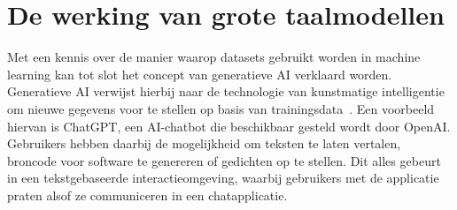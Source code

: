 \section{De werking van grote taalmodellen}
\label{sec:ls-artificiele-intelligentie}
Met een kennis over de manier waarop datasets gebruikt worden in machine learning kan tot slot het concept van generatieve AI verklaard worden.
Generatieve AI verwijst hierbij naar de technologie van kunstmatige intelligentie om nieuwe gegevens voor te stellen op basis van trainingsdata~\autocite{Gupta2023}.
Een voorbeeld hiervan is ChatGPT, een AI-chatbot die beschikbaar gesteld wordt door OpenAI\@.
Gebruikers hebben daarbij de mogelijkheid om teksten te laten vertalen, broncode voor software te genereren of gedichten op te stellen.
Dit alles gebeurt in een tekstgebaseerde interactieomgeving, waarbij gebruikers met de applicatie praten alsof ze communiceren in een chatapplicatie.

